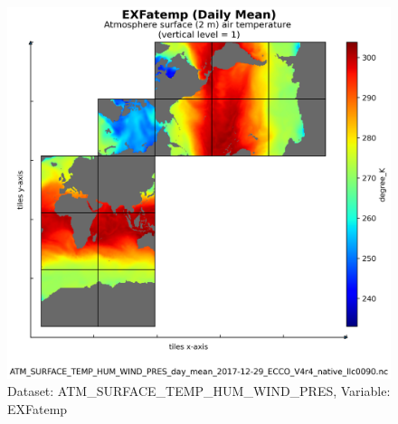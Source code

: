 \begin{figure}[H]
\centering
\includegraphics[scale=0.55]{../images/plots/native_plots/Atmosphere_Surface_Temperature_Humidity_Wind_and_Pressure/EXFatemp.png}
\caption{Dataset: ATM\_SURFACE\_TEMP\_HUM\_WIND\_PRES, Variable: EXFatemp}
\label{tab:table-ATM_SURFACE_TEMP_HUM_WIND_PRES_EXFatemp-Plot}
\end{figure}
\newpage
\pagebreak
